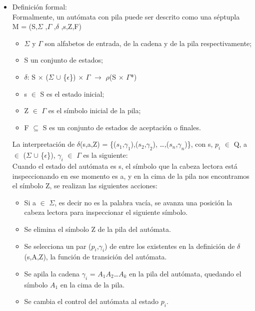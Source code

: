 \documentclass[12pt,a4paper,spanish]{book}
\begin{document}
\begin{itemize}
\item Definici\'on formal:\\
\newline
Formalmente, un aut\'omata con pila puede ser descrito como una s\'eptupla \\
M = (S,$\Sigma$ ,$\Gamma$ ,$\delta$ ,s,Z,F)
\begin{itemize}
\item $\Sigma$  y $\Gamma$ son alfabetos de entrada, de la cadena y de la pila respectivamente;\\
\item S un conjunto de estados;\\
\item $\delta$: S $\times$ ($\Sigma$ $\cup$ \{$\epsilon$\}) $\times$ $\Gamma$ $\rightarrow$ $\rho$(S $\times$ $\Gamma$*)\\
\item s $\in$ S es el estado inicial;\\
\item Z $\in$ $\Gamma$ es el s\'imbolo inicial de la pila;\\
\item F $\subseteq$ S es un conjunto de estados de aceptaci\'on o finales.\\
\end{itemize}
\newpage
La interpretaci\'on de $\delta$(s,a,Z) = \{($s_{1}$,$\gamma_{1}$),($s_{2}$,$\gamma_{2}$), \ldots ,($s_{n}$,$\gamma_{n}$)\}, con s, $p_{i}$ $\in$ Q, a $\in$ ($\Sigma$ $\cup$ \{$\epsilon$\}), $\gamma_{i}$ $\in$ $\Gamma$ es la siguiente:\\

Cuando el estado del aut\'omata es s, el s\'imbolo que la cabeza lectora est\'a inspeccionando en ese momento es a, y en la cima de la pila nos encontramos el s\'imbolo Z, se realizan las siguientes acciones:\\
\begin{itemize}
\item Si a $\in$ $\Sigma$, es decir no es la palabra vac\'ia, se avanza una posici\'on la cabeza lectora para inspeccionar el siguiente s\'imbolo.
\item Se elimina el s\'imbolo Z de la pila del aut\'omata.
\item Se selecciona un par ($p_{i}$,$\gamma_{i}$)  de entre los existentes en la definici\'on de $\delta$(s,A,Z), la funci\'on de transici\'on del aut\'omata.
\item Se apila la cadena $\gamma_{i}$ = $A_{1}$$A_{2}$\ldots$A_{k}$  en la pila del aut\'omata, quedando el s\'imbolo $A_{1}$  en la cima de la pila.
\item Se cambia el control del aut\'omata al estado $p_{i}$.
\end{itemize}


\end{itemize}
\end{document}
